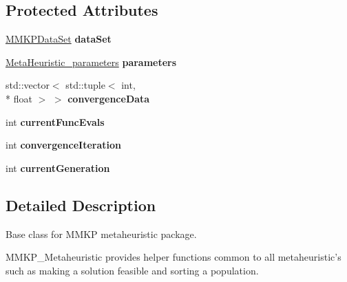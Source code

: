 \subsection*{Protected Attributes}
\begin{DoxyCompactItemize}
\item 
\hypertarget{class_m_m_k_p___meta_heuristic_aae7839d83a097e83579ad478f4580088}{\hyperlink{class_m_m_k_p_data_set}{M\+M\+K\+P\+Data\+Set} {\bfseries data\+Set}}\label{class_m_m_k_p___meta_heuristic_aae7839d83a097e83579ad478f4580088}

\item 
\hypertarget{class_m_m_k_p___meta_heuristic_a2af79355b04e7cea245642419bf5f8fa}{\hyperlink{class_meta_heuristic__parameters}{Meta\+Heuristic\+\_\+parameters} {\bfseries parameters}}\label{class_m_m_k_p___meta_heuristic_a2af79355b04e7cea245642419bf5f8fa}

\item 
\hypertarget{class_m_m_k_p___meta_heuristic_a2c41026ea80e4199ecf0deea574216d5}{std\+::vector$<$ std\+::tuple$<$ int, \\*
float $>$ $>$ {\bfseries convergence\+Data}}\label{class_m_m_k_p___meta_heuristic_a2c41026ea80e4199ecf0deea574216d5}

\item 
\hypertarget{class_m_m_k_p___meta_heuristic_a58ca3c34d8f21477ae2bb5cdef932ae0}{int {\bfseries current\+Func\+Evals}}\label{class_m_m_k_p___meta_heuristic_a58ca3c34d8f21477ae2bb5cdef932ae0}

\item 
\hypertarget{class_m_m_k_p___meta_heuristic_abe306de9fba980053a08393796943fe2}{int {\bfseries convergence\+Iteration}}\label{class_m_m_k_p___meta_heuristic_abe306de9fba980053a08393796943fe2}

\item 
\hypertarget{class_m_m_k_p___meta_heuristic_a6bd7bf953c49c4cd1a957269784402fd}{int {\bfseries current\+Generation}}\label{class_m_m_k_p___meta_heuristic_a6bd7bf953c49c4cd1a957269784402fd}

\end{DoxyCompactItemize}


\subsection{Detailed Description}
Base class for M\+M\+K\+P metaheuristic package. 

M\+M\+K\+P\+\_\+\+Metaheuristic provides helper functions common to all metaheuristic's such as making a solution feasible and sorting a population. 

